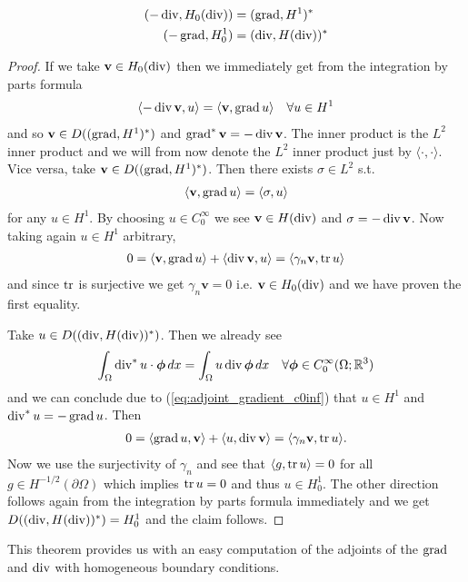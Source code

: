 \documentclass[../master_thesis.tex]{subfiles}
\begin{document}
\begin{theorem}\label{thm:adjoints_grad_div_without_bc}
    \begin{align}
        (-\operatorname{div}, H_0(\operatorname{div})) &= (\operatorname{grad}, H^1)^* \\
        (-\operatorname{grad}, H_0^1) &= (\operatorname{div}, H(\operatorname{div}))^*
    \end{align}
\end{theorem}
\begin{proof}
    If we take $\mathbf{v} \in H_0(\operatorname{div})$ then we immediately get 
    from the integration by parts formula
    \begin{align*}
        \langle -\operatorname{div} \mathbf{v}, u \rangle = \langle \mathbf{v}, \operatorname{grad} u \rangle \quad \forall u \in H^1
    \end{align*}
    and so $\mathbf{v} \in D((\operatorname{grad}, H^1)^*)$ and $\operatorname{grad}^* \mathbf{v} = -\operatorname{div} \mathbf{v}$.
    The inner product is the $L^2$ inner product and we will from now denote the $L^2$ inner 
    product just by $\langle \cdot , \cdot \rangle$.
    Vice versa, take $\mathbf{v} \in D((\operatorname{grad}, H^1)^*)$. Then there exists 
    $\sigma \in L^2$ s.t.
    \begin{align*}
        \langle \mathbf{v}, \operatorname{grad} u\rangle = \langle \sigma, u \rangle
    \end{align*}
    for any $u \in H^1$. By choosing $u \in C_0^\infty$ we see 
    $\mathbf{v} \in H(\operatorname{div})$ and $\sigma = -\operatorname{div} \mathbf{v}$. 
    Now taking again $u \in H^1$ arbitrary,
    \begin{align*}
        0 = \langle \mathbf{v}, \operatorname{grad} u \rangle + \langle \operatorname{div} \mathbf{v}, u \rangle
        = \langle \gamma_n \mathbf{v}, \operatorname{tr} u \rangle
    \end{align*}
    and since $\operatorname{tr}$ is surjective we get $\gamma_n \mathbf{v} = 0$ i.e. 
    $\mathbf{v} \in H_0(\operatorname{div})$ and we have proven the first equality.

    Take $u \in D((\operatorname{div}, H(\operatorname{div}))^*)$. Then we already see
    \begin{align*}
        \int_\Omega \operatorname{div}^*u \cdot \bm{\phi} \, dx
        = \int_\Omega u \operatorname{div} \bm{\phi} \, dx \quad \forall \bm{\phi} \in C_0^\infty(\Omega;\mathbb{R}^3)
    \end{align*}
    and we can conclude due to (\ref{eq:adjoint_gradient_c0inf}) that $u \in H^1$ and
    $\operatorname{div}^*u = -\operatorname{grad} u$. Then 
    \begin{align*}
        0 = \langle \operatorname{grad} u, \mathbf{v} \rangle
            + \langle u, \operatorname{div} \mathbf{v} \rangle
        = \langle \gamma_n \mathbf{v}, \operatorname{tr} u \rangle.
    \end{align*}
    Now we use the surjectivity of $\gamma_n$ and see that 
    $\langle g, \operatorname{tr} u \rangle = 0$ for all $g \in H^{-1/2}(\partial \Omega)$ which 
    implies $\operatorname{tr} u = 0$ and thus $u \in H^1_0$. The other direction follows again 
    from the integration by parts formula immediately and we get 
    $D((\operatorname{div}, H(\operatorname{div}))^*) = H^1_0$ and the claim follows.
\end{proof}
This theorem provides us with an easy computation of the adjoints 
of the $\operatorname{grad}$ and $\operatorname{div}$ with homogeneous boundary conditions.
\end{document}

